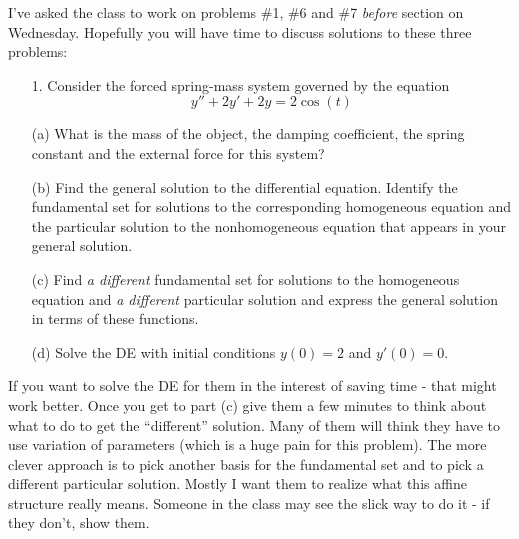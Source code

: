 \documentclass[epsf]{article}
\begin{document}
 I've asked the class to work on problems \#1, \#6 and \#7 \textit{before} section on Wednesday.  Hopefully you will have time to discuss solutions to these three problems:

\begin{itemize}

\item[1.] Consider the forced spring-mass system governed by the equation $$y''+ 2y' +2y = 2\cos(t)$$

\noi (a) What is the mass of the object, the damping coefficient, the spring constant and the external force for this system?
\vskip 2mm

\noi (b) Find the general solution to the differential equation.  Identify the fundamental set for solutions to the corresponding homogeneous equation and the particular solution to the nonhomogeneous equation that appears in your general solution.
\vskip 2mm

\noi (c) Find \textit{a different} fundamental set for solutions to the homogeneous equation and \textit{a different} particular solution and express the general solution in terms of these functions.
\vskip 2mm

\noi (d) Solve the DE with initial conditions $y(0) = 2$ and $y'(0) = 0$.
\end{itemize}

 If you want to solve the DE for them in the interest of saving time - that might work better.  Once you get to part (c) give them a few minutes to think about what to do to get the ``different'' solution.  Many of them will think they have to use variation of parameters (which is a huge pain for this problem).  The more clever approach is to pick another basis for the fundamental set and to pick a different particular solution.  Mostly I want them to realize what this affine structure really means.  Someone in the class may see the slick way to do it - if they don't, show them.\\
\end{document}
